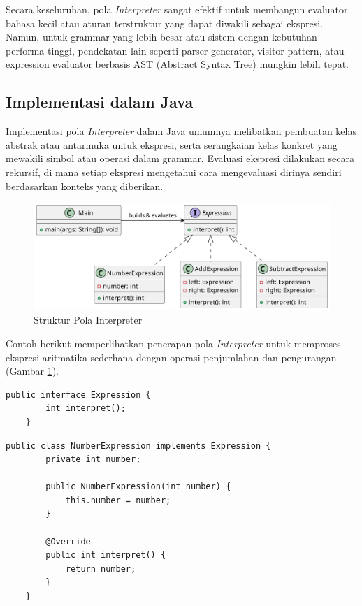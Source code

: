 Secara keseluruhan, pola \textit{Interpreter} sangat efektif untuk membangun evaluator bahasa kecil atau aturan terstruktur yang dapat diwakili sebagai ekspresi. Namun, untuk grammar yang lebih besar atau sistem dengan kebutuhan performa tinggi, pendekatan lain seperti parser generator, visitor pattern, atau expression evaluator berbasis AST (Abstract Syntax Tree) mungkin lebih tepat.


\subsection{Implementasi dalam Java}

Implementasi pola \textit{Interpreter} dalam Java umumnya melibatkan pembuatan kelas abstrak atau antarmuka untuk ekspresi, serta serangkaian kelas konkret yang mewakili simbol atau operasi dalam grammar. Evaluasi ekspresi dilakukan secara rekursif, di mana setiap ekspresi mengetahui cara mengevaluasi dirinya sendiri berdasarkan konteks yang diberikan.

\begin{figure}[h]
	\centering
	\includegraphics[width=\textwidth]{../figures/out/interpreter.png}
	\caption{Struktur Pola Interpreter}
	\label{fig:interpreter}
\end{figure}


Contoh berikut memperlihatkan penerapan pola \textit{Interpreter} untuk memproses ekspresi aritmatika sederhana dengan operasi penjumlahan dan pengurangan (Gambar \ref{fig:interpreter}).

\begin{lstlisting}[style=JavaStyle, caption={Antarmuka Ekspresi}, label={lst:interpreter-interface}]
	public interface Expression {
		int interpret();
	}
\end{lstlisting}

\begin{lstlisting}[style=JavaStyle, caption={Ekspresi Konstanta (Leaf)}, label={lst:interpreter-number}]
	public class NumberExpression implements Expression {
		private int number;
		
		public NumberExpression(int number) {
			this.number = number;
		}
		
		@Override
		public int interpret() {
			return number;
		}
	}
\end{lstlisting}

